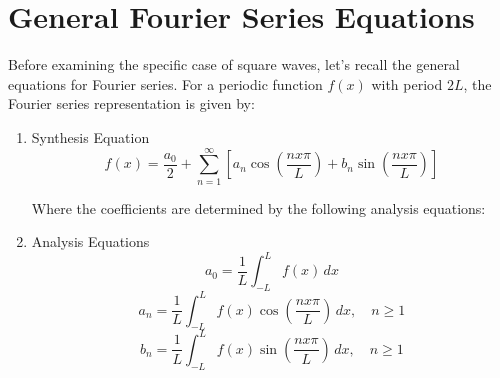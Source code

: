 \documentclass{article}
\begin{document}
\section{General Fourier Series Equations}

Before examining the specific case of square waves, let's recall the general equations for Fourier series. For a periodic function $f(x)$ with period $2L$, the Fourier series representation is given by:


\begin{enumerate}
    \item Synthesis Equation
    \begin{equation}
    f(x) = \frac{a_0}{2} + \sum_{n=1}^{\infty} \left[ a_n \cos\left(\frac{nx\pi}{L}\right) + b_n \sin(\frac{nx\pi}{L}) \right] 
\end{equation}


Where the coefficients are determined by the following analysis equations:

    \item Analysis Equations
    \begin{equation}
    a_0 = \frac{1}{L} \int_{-L}^{L} f(x) \, dx
    \label{a0}
    \end{equation}
    \begin{equation}
    a_n = \frac{1}{L} \int_{-L}^{L} f(x) \cos(\frac{nx\pi}{L}) \, dx, \quad n \geq 1
    \end{equation}
    \begin{equation}
    b_n = \frac{1}{L} \int_{-L}^{L} f(x) \sin(\frac{nx\pi}{L}) \, dx, \quad n \geq 1
    \label{bn}
    \end{equation}
    \end{enumerate}
\end{document}
